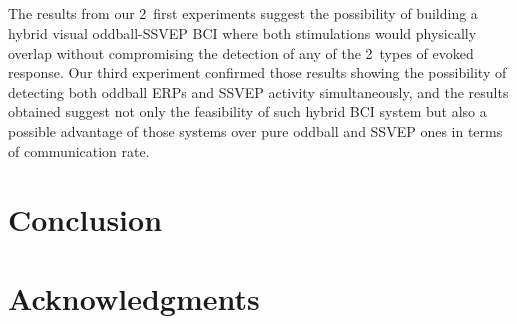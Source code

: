 \documentclass[10pt]{article}
\begin{document}
    \subsection{}
    \label{sec:4Discuss3}
    The results from our 2~first experiments suggest the possibility of building a hybrid visual oddball-SSVEP BCI where both stimulations would physically overlap without compromising the detection of any of the 2~types of evoked response.
    Our third experiment confirmed those results showing the possibility of detecting both oddball ERPs and SSVEP activity simultaneously, and the results obtained suggest not only the feasibility of such hybrid BCI system but also a possible advantage of those systems over pure oddball and SSVEP ones in terms of communication rate.



\section{Conclusion}
\label{sec:6Conclusion}

\section*{Acknowledgments}

\printbibliography

%




\end{document}
